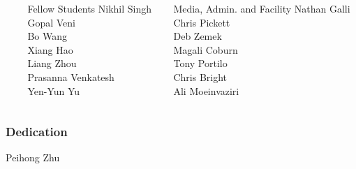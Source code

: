 \documentclass[sansserif, 10pt]{beamer}
\begin{document}
{\begin{frame}
\begin{columns}
\begin{column}{0.3\textwidth}
      \end{column}


      \begin{column}{0.4\textwidth}
        {
           {
            \begin{block}{Fellow Students}
              Nikhil Singh\\
              Gopal Veni \\
              Bo Wang\\
              Xiang Hao\\ 
              Liang Zhou \\
              Prasanna Venkatesh\\
              Yen-Yun Yu
            \end{block}
          }
        }
      \end{column}

      \begin{column}{0.3\textwidth}

        {
           {
            \begin{block}{Media, Admin. and Facility}
              Nathan Galli\\
              Chris Pickett\\
              Deb Zemek\\
              Magali Coburn\\
              Tony Portilo\\
              Chris Bright\\
              Ali Moeinvaziri\\
            \end{block}
          }
        }
      \end{column}

    \end{columns}
  \end{frame}
}


\begin{frame}
  \frametitle{Dedication}
  \centering
  {
    \calligra
    Peihong Zhu
  }
\end{frame}
\end{document}

